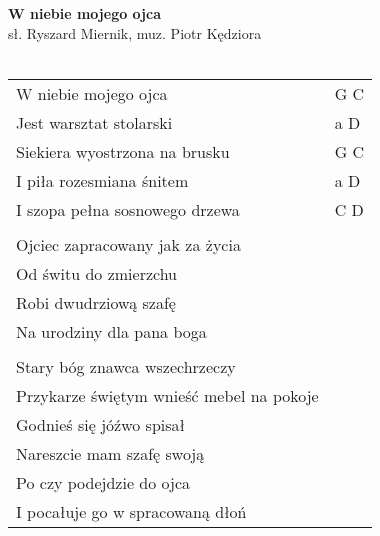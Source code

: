\documentclass[a5paper]{article}
\begin{document}


\noindent
\fontsize{12pt}{15pt}\selectfont
\textbf{W niebie mojego ojca} \\
\fontsize{8pt}{10pt}\selectfont
sł. Ryszard Miernik, muz. Piotr Kędziora\\ \\
\fontsize{10pt}{12pt}\selectfont
{}
\begin{tabular}{@{}p{7.50cm}p{3cm}@{}}
\noindent
W niebie mojego ojca & G C \\
Jest warsztat stolarski & a D \\
Siekiera wyostrzona na brusku & G C \\
I piła rozesmiana śnitem & a D \\
I szopa pełna sosnowego drzewa & C D \\ \\

Ojciec zapracowany jak za życia \\
Od świtu do zmierzchu \\
Robi dwudrziową szafę \\
Na urodziny dla pana boga \\ \\

Stary bóg znawca wszechrzeczy \\
Przykarze świętym wnieść mebel na pokoje \\
Godnieś się jóźwo spisał \\
Nareszcie mam szafę swoją \\
Po czy podejdzie do ojca \\
I pocałuje go w spracowaną dłoń
\end{tabular}
\end{document}
